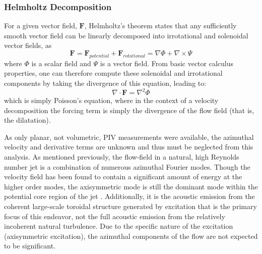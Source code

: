 \subsubsection{Helmholtz Decomposition}
For a given vector field, $\mathbf{F}$, Helmholtz's theorem states that any sufficiently smooth vector field can be linearly decomposed into irrotational and solenoidal vector fields, as
\begin{equation}
\mathbf{F} = \mathbf{F}_{potential} + \mathbf{F}_{rotational} = \nabla \Phi + \nabla \times \Psi
\end{equation}
where $\Phi$ is a scalar field and $\Psi$ is a vector field.
From basic vector calculus properties, one can therefore compute these solenoidal and irrotational components by taking the divergence of this equation, leading to:
\begin{equation}
\nabla \cdot \mathbf{F} = \nabla^{2} \Phi
\end{equation}
which is simply Poisson's equation, where in the context of a velocity decomposition the forcing term is simply the divergence of the flow field (that is, the dilatation).

As only planar, not volumetric, PIV measurements were available, the azimuthal velocity and derivative terms are unknown and thus must be neglected from this analysis.
As mentioned previously, the flow-field in a natural, high Reynolds number jet is a combination of numerous azimuthal Fourier modes.
Though the velocity field has been found to contain a significant amount of energy at the higher order modes, the axisymmetric mode is still the dominant mode within the potential core region of the jet \citep{Glauser1987}.
Additionally, it is the acoustic emission from the coherent large-scale toroidal structure generated by excitation that is the primary focus of this endeavor, not the full acoustic emission from the relatively incoherent natural turbulence.
Due to the specific nature of the excitation (axisymmetric excitation), the azimuthal components of the flow are not expected to be significant.


